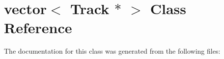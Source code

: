 \hypertarget{classvector_3_01Track_01_5_01_4}{
\section{vector$<$ Track $\ast$ $>$ Class Reference}
\label{classvector_3_01Track_01_5_01_4}
}


The documentation for this class was generated from the following files: